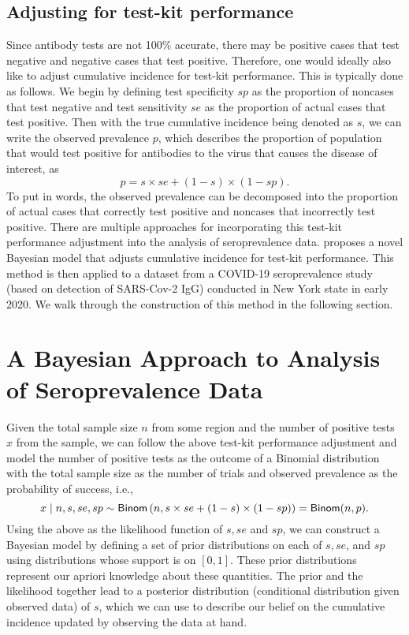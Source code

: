 \subsection{Adjusting for test-kit performance}
Since antibody tests are not 100\% accurate, there may be positive cases that test negative and negative cases that test positive. Therefore, one would ideally also like to adjust cumulative incidence for test-kit performance. This is typically done as follows. We begin by defining test specificity $sp$ as the proportion of noncases that test negative and test sensitivity $se$ as the proportion of actual cases that test positive. Then with the true cumulative incidence being denoted as $s$, we can write the observed prevalence $p$, which describes the proportion of population that would test positive for antibodies to the virus that causes the disease of interest, as
\[
p = s \times se + (1-s) \times (1 - sp).
\]
To put in words, the observed prevalence can be decomposed into the proportion of actual cases that correctly test positive and noncases that incorrectly test positive. There are multiple approaches for incorporating this test-kit performance adjustment into the analysis of seroprevalence data. \cite{meyer2022adjusting} proposes a novel Bayesian model that adjusts cumulative incidence for test-kit performance. This method is then applied to a dataset from a COVID-19 seroprevalence study (based on detection of SARS-Cov-2 IgG) conducted in New York state in early 2020. We walk through the construction of this method in the following section.
\section{A Bayesian Approach to Analysis of Seroprevalence Data}
Given the total sample size $n$ from some region and the number of positive tests $x$ from the sample, we can follow the above test-kit performance adjustment and model the number of positive tests as the outcome of a Binomial distribution with the total sample size as the number of trials and observed prevalence as the probability of success, i.e.,
\[
x \mid n, s, se, sp \sim {\sf{Binom}}\left(n, s \times se + (1-s) \times (1 - sp)\right) = {\sf{Binom}}(n, p).
\]
Using the above as the likelihood function of $s, se$ and $sp$, we can construct a Bayesian model by defining a set of prior distributions on each of $s, se$, and $sp$ using distributions whose support is on $[0,1]$. These prior distributions represent our apriori knowledge about these quantities. The prior and the likelihood together lead to a posterior distribution (conditional distribution given observed data) of $s$, which we can use to describe our belief on the cumulative incidence updated by observing the data at hand. 
